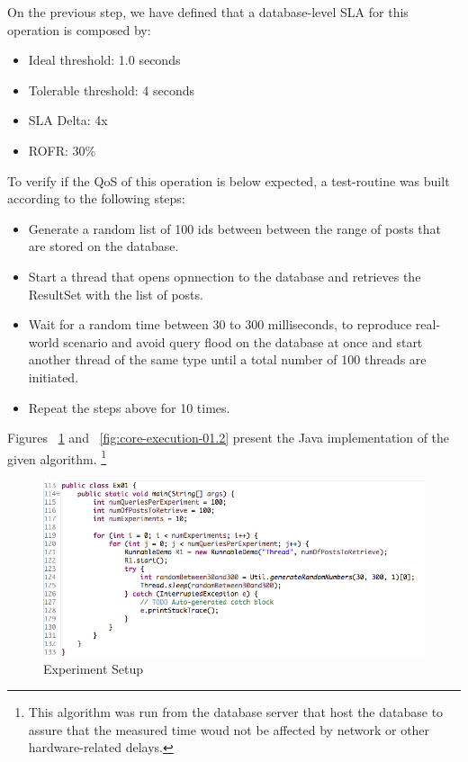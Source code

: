 On the previous step, we have defined that a database-level SLA for this operation is composed by: 

\begin{itemize}
	\item{Ideal threshold: 1.0 seconds}
	\item{Tolerable threshold: 4 seconds}
	\item{SLA Delta: 4x}
	\item{ROFR: 30\%}
\end{itemize}

To verify if the QoS of this operation is below expected, a test-routine was built according to the following steps: 

\begin{itemize}
\item{Generate a random list of 100 ids between between the range of posts that are stored on the database.} 
\item{Start a thread that opens opnnection to the database and retrieves the ResultSet with the list of posts.}
\item{Wait for a random time between 30 to 300 milliseconds, to reproduce real-world scenario and avoid	query flood on the database at once and start another thread of the same type until a total number of 100 threads are initiated.}
\item{Repeat the steps above for 10 times.}
\end{itemize}

Figures ~\ref{fig:core-execution-01} and ~\ref{fig:core-execution-01.2} present the Java implementation of the given algorithm. \footnote{This algorithm was run from the database server that host the database to assure that the measured time woud not be affected by network or other hardware-related delays.}


\begin{figure}[ht!]
\centering
\includegraphics[width=120mm]{Imagens/core-execution-01-1.png}
\caption{Experiment Setup \label{fig:core-execution-01}}
\end{figure}

